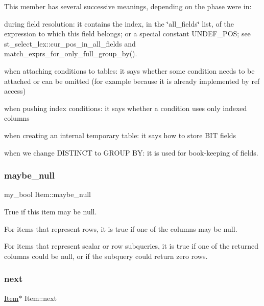 This member has several successive meanings, depending on the phase we\textquotesingle{}re in\+:
\begin{DoxyItemize}
\item during field resolution\+: it contains the index, in the \char`\"{}all\+\_\+fields\char`\"{} list, of the expression to which this field belongs; or a special constant U\+N\+D\+E\+F\+\_\+\+P\+OS; see st\+\_\+select\+\_\+lex\+::cur\+\_\+pos\+\_\+in\+\_\+all\+\_\+fields and match\+\_\+exprs\+\_\+for\+\_\+only\+\_\+full\+\_\+group\+\_\+by().
\item when attaching conditions to tables\+: it says whether some condition needs to be attached or can be omitted (for example because it is already implemented by \textquotesingle{}ref\textquotesingle{} access)
\item when pushing index conditions\+: it says whether a condition uses only indexed columns
\item when creating an internal temporary table\+: it says how to store B\+IT fields
\item when we change D\+I\+S\+T\+I\+N\+CT to G\+R\+O\+UP BY\+: it is used for book-\/keeping of fields. 
\end{DoxyItemize}\mbox{\label{classItem_a4c62081a1b4986d26cf265143f403e4b}} 
\subsubsection{\texorpdfstring{maybe\+\_\+null}{maybe\_null}}
{\footnotesize\ttfamily my\+\_\+bool Item\+::maybe\+\_\+null}

True if this item may be null.

For items that represent rows, it is true if one of the columns may be null.

For items that represent scalar or row subqueries, it is true if one of the returned columns could be null, or if the subquery could return zero rows. \mbox{\label{classItem_af41ed24b86b2126cf7eacc591a863f47}} 
\subsubsection{\texorpdfstring{next}{next}}
{\footnotesize\ttfamily \mbox{\hyperlink{classItem}{Item}}$\ast$ Item\+::next}

